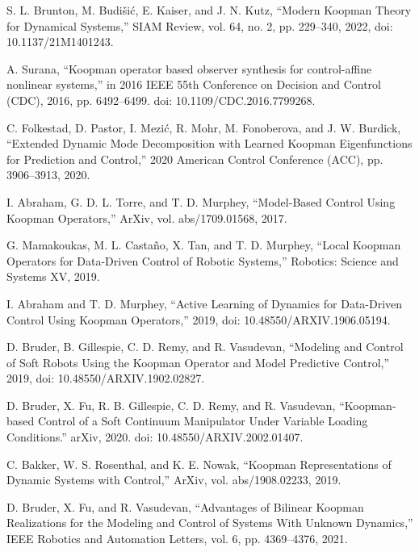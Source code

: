 \documentclass{article}
\begin{document}


\begin{thebibliography}{99}

 S. L. Brunton, M. Budišić, E. Kaiser, and J. N. Kutz, “Modern Koopman Theory for Dynamical Systems,” SIAM Review, vol. 64, no. 2, pp. 229–340, 2022, doi: 10.1137/21M1401243.

 A. Surana, “Koopman operator based observer synthesis for control-affine nonlinear systems,” in 2016 IEEE 55th Conference on Decision and Control (CDC), 2016, pp. 6492–6499. doi: 10.1109/CDC.2016.7799268.

 C. Folkestad, D. Pastor, I. Mezić, R. Mohr, M. Fonoberova, and J. W. Burdick, “Extended Dynamic Mode Decomposition with Learned Koopman Eigenfunctions for Prediction and Control,” 2020 American Control Conference (ACC), pp. 3906–3913, 2020.

 I. Abraham, G. D. L. Torre, and T. D. Murphey, “Model-Based Control Using Koopman Operators,” ArXiv, vol. abs/1709.01568, 2017.

 G. Mamakoukas, M. L. Castaño, X. Tan, and T. D. Murphey, “Local Koopman Operators for Data-Driven Control of Robotic Systems,” Robotics: Science and Systems XV, 2019.

 I. Abraham and T. D. Murphey, “Active Learning of Dynamics for Data-Driven Control Using Koopman Operators,” 2019, doi: 10.48550/ARXIV.1906.05194.

 D. Bruder, B. Gillespie, C. D. Remy, and R. Vasudevan, “Modeling and Control of Soft Robots Using the Koopman Operator and Model Predictive Control,” 2019, doi: 10.48550/ARXIV.1902.02827.

 D. Bruder, X. Fu, R. B. Gillespie, C. D. Remy, and R. Vasudevan, “Koopman-based Control of a Soft Continuum Manipulator Under Variable Loading Conditions.” arXiv, 2020. doi: 10.48550/ARXIV.2002.01407.


 C. Bakker, W. S. Rosenthal, and K. E. Nowak, “Koopman Representations of Dynamic Systems with Control,” ArXiv, vol. abs/1908.02233, 2019.

 D. Bruder, X. Fu, and R. Vasudevan, “Advantages of Bilinear Koopman Realizations for the Modeling and Control of Systems With Unknown Dynamics,” IEEE Robotics and Automation Letters, vol. 6, pp. 4369–4376, 2021.


\end{thebibliography}
\end{document}
